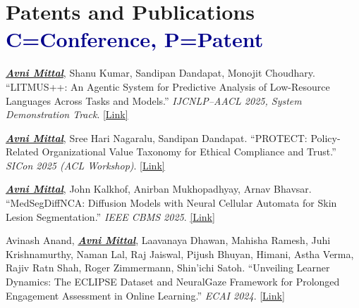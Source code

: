 \documentclass[a4paper,11pt]{article}
\begin{document}
\vspace{-2mm}

\section{\textbf{Patents and Publications} \hfill \textcolor{darkblue}{\scriptsize C=Conference, P=Patent}}
\vspace{0.5mm}
\small{
\begin{enumerate}[leftmargin=*, labelsep=0.5em, align=left, widest={[\textbf{S.1}]}, itemindent=0em, label={\textbf{[\arabic*]}}]




\item[\textbf{[C.1]}] 
\textit{\underline{\textbf{Avni Mittal}}}, Shanu Kumar, Sandipan Dandapat, Monojit Choudhary.  
“LITMUS++: An Agentic System for Predictive Analysis of Low-Resource Languages Across Tasks and Models.”  
\textit{IJCNLP–AACL 2025, System Demonstration Track}.  
\href{https://aclanthology.org/2025.ijcnlp-demo.6/}{[Link]}

\item[\textbf{[C.2]}] 
\textit{\underline{\textbf{Avni Mittal}}}, Sree Hari Nagaralu, Sandipan Dandapat.  
“PROTECT: Policy-Related Organizational Value Taxonomy for Ethical Compliance and Trust.”  
\textit{SICon 2025 (ACL Workshop)}.  
\href{https://aclanthology.org/2025.sicon-1.5/}{[Link]}

\item[\textbf{[C.3]}] 
\textit{\underline{\textbf{Avni Mittal}}}, John Kalkhof, Anirban Mukhopadhyay, Arnav Bhavsar.  
“MedSegDiffNCA: Diffusion Models with Neural Cellular Automata for Skin Lesion Segmentation.”  
\textit{IEEE CBMS 2025}.  
\href{https://www.computer.org/csdl/proceedings-article/cbms/2025/261000a035/284Khy3rT3i}{[Link]}

\item[\textbf{[C.4]}] 
Avinash Anand, \textit{\underline{\textbf{Avni Mittal}}}, Laavanaya Dhawan, Mahisha Ramesh, Juhi Krishnamurthy,  
Naman Lal, Raj Jaiswal, Pijush Bhuyan, Himani, Astha Verma, Rajiv Ratn Shah, Roger Zimmermann, Shin’ichi Satoh.  
“Unveiling Learner Dynamics: The ECLIPSE Dataset and NeuralGaze Framework for Prolonged Engagement Assessment in Online Learning.”  
\textit{ECAI 2024}.  
\href{https://ieeexplore.ieee.org/abstract/document/10707841}{[Link]}


\end{enumerate}}
\end{document}
